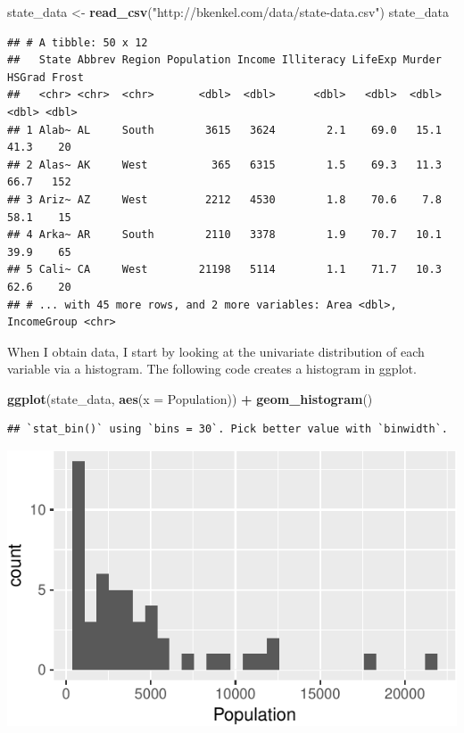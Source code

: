 \documentclass[
  12pt,
  oneside,openany]{book}
\newenvironment{Shaded}{\begin{snugshade}}{\end{snugshade}}
\newcommand{\DataTypeTok}[1]{\textcolor[rgb]{0.13,0.29,0.53}{#1}}
\newcommand{\KeywordTok}[1]{\textcolor[rgb]{0.13,0.29,0.53}{\textbf{#1}}}
\newcommand{\NormalTok}[1]{#1}
\newcommand{\OperatorTok}[1]{\textcolor[rgb]{0.81,0.36,0.00}{\textbf{#1}}}
\newcommand{\StringTok}[1]{\textcolor[rgb]{0.31,0.60,0.02}{#1}}
\begin{document}
\begin{Shaded}
\begin{Highlighting}[]
\NormalTok{state\_data \textless{}{-}}\StringTok{ }\KeywordTok{read\_csv}\NormalTok{(}\StringTok{"http://bkenkel.com/data/state{-}data.csv"}\NormalTok{)}
\NormalTok{state\_data}
\end{Highlighting}
\end{Shaded}

\begin{verbatim}
## # A tibble: 50 x 12
##   State Abbrev Region Population Income Illiteracy LifeExp Murder HSGrad Frost
##   <chr> <chr>  <chr>       <dbl>  <dbl>      <dbl>   <dbl>  <dbl>  <dbl> <dbl>
## 1 Alab~ AL     South        3615   3624        2.1    69.0   15.1   41.3    20
## 2 Alas~ AK     West          365   6315        1.5    69.3   11.3   66.7   152
## 3 Ariz~ AZ     West         2212   4530        1.8    70.6    7.8   58.1    15
## 4 Arka~ AR     South        2110   3378        1.9    70.7   10.1   39.9    65
## 5 Cali~ CA     West        21198   5114        1.1    71.7   10.3   62.6    20
## # ... with 45 more rows, and 2 more variables: Area <dbl>, IncomeGroup <chr>
\end{verbatim}

When I obtain data, I start by looking at the univariate distribution of each variable via a histogram. The following code creates a histogram in ggplot.

\begin{Shaded}
\begin{Highlighting}[]
\KeywordTok{ggplot}\NormalTok{(state\_data, }\KeywordTok{aes}\NormalTok{(}\DataTypeTok{x =}\NormalTok{ Population)) }\OperatorTok{+}
\StringTok{  }\KeywordTok{geom\_histogram}\NormalTok{()}
\end{Highlighting}
\end{Shaded}

\begin{verbatim}
## `stat_bin()` using `bins = 30`. Pick better value with `binwidth`.
\end{verbatim}

\includegraphics{pdaps_files/figure-latex/histogram-1.pdf}
\end{document}
